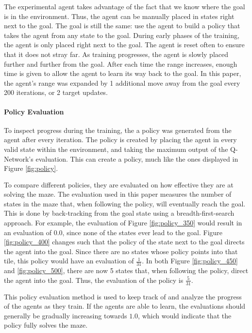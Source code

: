 \documentclass[12pt,letterpaper]{article}
\begin{document}
The experimental agent takes advantage of the fact that we know where the goal is in the environment.
Thus, the agent can be manually placed in states right next to the goal.
The goal is still the same: use the agent to build a policy that takes the agent from any state to the goal.
During early phases of the training, the agent is only placed right next to the goal.
The agent is reset often to ensure that it does not stray far.
As training progresses, the agent is slowly placed further and further from the goal.
After each time the range increases, enough time is given to allow the agent to learn its way back to the goal.
In this paper, the agent's range was expanded by 1 additional move away from the goal every 200 iterations, or 2 target updates.

\paragraph{Policy Evaluation}

To inspect progress during the training, the a policy was generated from the agent after every iteration.
The policy is created by placing the agent in every valid state within the environment, and taking the maximum output of the Q-Network's evaluation.
This can create a policy, much like the ones displayed in Figure \ref{fig:policy}.

To compare different policies, they are evaluated on how effective they are at solving the maze.
The evaluation used in this paper measures the number of states in the maze that, when following the policy, will eventually reach the goal.
This is done by back-tracking from the goal state using a breadth-first-search approach.
For example, the evaluation of Figure \ref{fig:policy_350} would result in an evaluation of $0.0$, since none of the states ever lead to the goal.
Figure \ref{fig:policy_400} changes such that the policy of the state next to the goal directs the agent into the goal.
Since there are no states whose policy points into that tile, this policy would have an evaluation of $\frac{1}{31}$.
In both Figure \ref{fig:policy_450} and \ref{fig:policy_500}, there are now 5 states that, when following the policy, direct the agent into the goal.
Thus, the evaluation of the policy is $\frac{5}{31}$.

This policy evaluation method is used to keep track of and analyze the progress of the agents as they train.
If the agents are able to learn, the evaluations should generally be gradually increasing towards $1.0$, which would indicate that the policy fully solves the maze.
\end{document}
